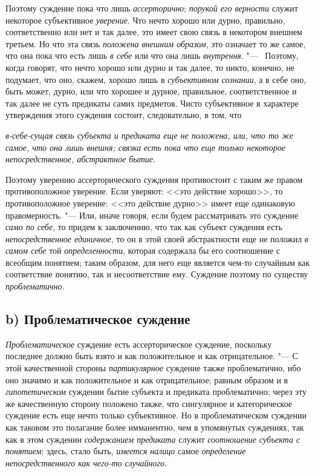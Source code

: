 {Поэтому суждение пока что лишь
{\em ассерторично};
{\em порукой его верности
}служит некоторое субъективное
{\em уверение}. Что нечто
хорошо или дурно, правильно, соответственно или нет и так далее, это имеет
свою связь в некотором внешнем третьем. Но что эта связь
{\em положена внешним образом},
это означает то же самое, что она пока что есть лишь
{\em в себе} или что она
лишь {\em внутрення}. "---
\ Поэтому, когда говорят, что нечто хорошо или дурно и так
далее, то никто, конечно, не подумает, что оно, скажем, хорошо лишь в
{\em субъективном сознании},
а в себе оно, быть может, дурно, или что хорошее и дурное,
правильное, соответственное и так далее не суть предикаты самих предметов.
Чисто субъективное в характере утверждения этого суждения состоит,
следовательно, в том, что
{\em в-себе-сущая
связь субъекта и предиката еще не
{\em положена}, или, что
то же самое, что она лишь {\em внешня};
связка есть пока что еще только некоторое непосредственное,
{\em абстрактное бытие}.

Поэтому уверению ассерторического суждения противостоит с
таким же правом противоположное уверение. Если уверяют: <<это действие
хорошо>>, то противоположное уверение: <<это действие дурно>> имеет еще
одинаковую правомерность. "--- Или, иначе говоря, если будем
рассматривать это суждение {\em само по
себе}, то придем к заключению, что так как субъект суждения
есть {\em непосредственное единичное},
то он в этой своей абстрактности еще не положил
{\em в самом себе} той
{\em определенности},
которая содержала бы его соотношение с всеобщим понятием;
таким образом, для него еще является чем-то случайным как соответствие
понятию, так и несоответствие ему. Суждение поэтому по существу
{\em проблематично}.

\subsection[b) Проблематическое суждение]{b) Проблематическое суждение}
{\em Проблематическое}
суждение есть ассерторическое суждение, поскольку последнее
должно быть взято и как положительное и как отрицательное. "---
С этой качественной стороны
{\em партикулярное}
суждение также проблематично, ибо оно значимо и как
положительное и как отрицательное; равным образом и в
{\em гипотетическом}
суждении бытие субъекта и предиката проблематично; через эту
же качественную сторону положено также, что сингулярное и категорическое
суждение есть еще нечто только субъективное. Но в проблематическом суждении
как таковом это полагание более имманентно, чем в упомянутых суждениях, так
как в этом суждении {\em содержанием
предиката} служит
{\em соотношение
}{\em субъекта с понятием};
здесь, стало быть,
{\em имеется налицо}
самое {\em определение
непосредственного как чего-то случайного}.

}}
